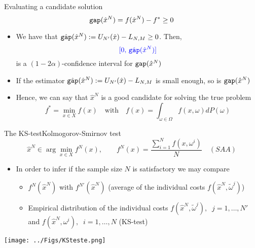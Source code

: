 \begin{frame}{Evaluating a candidate solution}
\[
{\tt gap}(\hat x^N) = f(\hat x^N)-f^*\geq 0
\]

\begin{itemize}
\item We have that
$
\hat{{\tt gap}}(\hat x^N):= U_{N'}(\hat x) - L_{N,M}\geq 0
$. Then,
\[
{\color{blue}[0,\,\hat{{\tt gap}}(\hat x^N)]}
\]
is a $(1-2\alpha)$-confidence interval for  ${\tt gap} (\hat x^N)$

\pula
\item If the estimator $\hat{{\tt gap}}(\hat x^N):= U_{N'}(\hat x) - L_{N,M}$ is small enough, so is ${\tt gap}(\hat x^N)$
\pula
\item Hence, we can say that $\hat x^N$ is a good candidate for solving the true problem
\[
f^*=\min_{x \in X} f(x)\quad \mbox{with}\quad f(x)=\int_{\omega \in \Omega} f(x,\omega)dP(\omega)
\]
\end{itemize}
\end{frame}



\begin{frame}{The KS-test}{Kolmogorov-Smirnov test}
\[
\hat x^N \in \arg \min_{x \in X} f^N(x), \quad \quad f^N(x)=\frac{\sum_{i=1}^N f(x,\omega^i)}{N}\quad (SAA)
\]

\begin{itemize}
\item In order to infer if the sample size $N$  is satisfactory we may compare
\pula
\begin{itemize}
\item $f^N(\hat x^N)$ with $f^{N'}(\hat x^N)$   (average of the individual costs $f(\hat x^N, \tilde \omega^j)$)
\pula

\item Empirical distribution of the individual costs  $f(\hat x^N, \tilde \omega^j),\;\;j=1,\ldots,N'$ and $f(\hat x^N,\omega^i),\;\;i=1,\ldots,N$ (KS-test)
\end{itemize}
\end{itemize}

\begin{center}
\texttt{[image: ../Figs/KSteste.png]} {}
\end{center}
 \end{frame}

